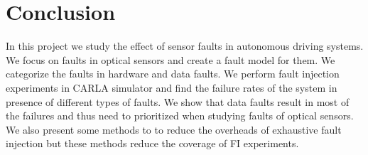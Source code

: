 \section{Conclusion}

In this project we study the effect of sensor faults in autonomous driving systems. We focus on faults in optical sensors and create a fault model for them. We categorize the faults in hardware and data faults. We perform fault injection experiments in CARLA simulator and find the failure rates of the system in presence of different types of faults. We show that data faults result in most of the failures and thus need to prioritized when studying faults of optical sensors. We also present some methods to to reduce the overheads of exhaustive fault injection but these methods reduce the coverage of FI experiments.